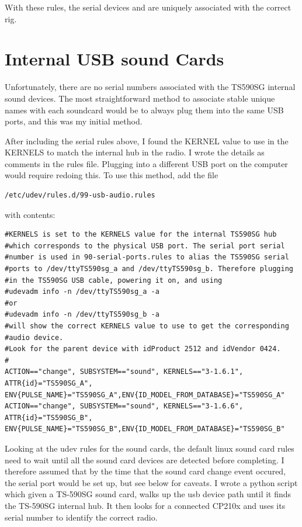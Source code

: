 \documentclass[12pt]{article}
\begin{document}
With these rules, the serial devices
 and  are uniquely
associated with the correct rig.

\section{Internal USB sound Cards}
Unfortunately, there are no serial numbers associated with the TS590SG
internal sound devices. The most straightforward method to associate
stable unique names with each soundcard would be to always plug them
into the same USB ports, and this was my initial method. 


After including the serial rules above, I found
the KERNEL value to use in the KERNELS to match the internal hub in the radio.
I wrote the details as comments in the rules file.
Plugging into a different USB port on the computer would
require redoing this. To use this method, add the file
\begin{verbatim}
/etc/udev/rules.d/99-usb-audio.rules
\end{verbatim}
with contents:
\begin{verbatim}
#KERNELS is set to the KERNELS value for the internal TS590SG hub
#which corresponds to the physical USB port. The serial port serial
#number is used in 90-serial-ports.rules to alias the TS590SG serial
#ports to /dev/ttyTS590sg_a and /dev/ttyTS590sg_b. Therefore plugging
#in the TS590SG USB cable, powering it on, and using
#udevadm info -n /dev/ttyTS590sg_a -a
#or
#udevadm info -n /dev/ttyTS590sg_b -a
#will show the correct KERNELS value to use to get the corresponding
#audio device.
#Look for the parent device with idProduct 2512 and idVendor 0424.
#
ACTION=="change", SUBSYSTEM=="sound", KERNELS=="3-1.6.1", ATTR{id}="TS590SG_A",
ENV{PULSE_NAME}="TS590SG_A",ENV{ID_MODEL_FROM_DATABASE}="TS590SG_A"
ACTION=="change", SUBSYSTEM=="sound", KERNELS=="3-1.6.6", ATTR{id}="TS590SG_B",
ENV{PULSE_NAME}="TS590SG_B",ENV{ID_MODEL_FROM_DATABASE}="TS590SG_B"
\end{verbatim}

Looking at the udev rules for the sound cards, the default linux
sound card rules need to wait until all the sound card devices are detected
before completing. I therefore assumed that by the time that the
sound card change event occured, the serial port would be set up,
but see below for caveats.
I wrote a python script which given a 
TS-590SG sound card, walks up the usb device path until it finds the
TS-590SG internal hub. It then looks for a connected CP210x and
uses its serial number to identify the correct radio.
\end{document}
